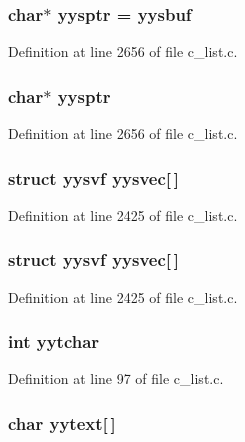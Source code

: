 \subsubsection{\setlength{\rightskip}{0pt plus 5cm}char$\ast$ \bf{yysptr} = \bf{yysbuf}}\label{c__list_8c_c2e277904ae84b934c585198523d740b}




Definition at line 2656 of file c\_\-list.c.
\subsubsection{\setlength{\rightskip}{0pt plus 5cm}char$\ast$ \bf{yysptr}}\label{c__list_8c_c2e277904ae84b934c585198523d740b}




Definition at line 2656 of file c\_\-list.c.
\subsubsection{\setlength{\rightskip}{0pt plus 5cm}struct \bf{yysvf} \bf{yysvec}[$\,$]}\label{c__list_8c_2011359449066c5432dae89171db9d17}




Definition at line 2425 of file c\_\-list.c.
\subsubsection{\setlength{\rightskip}{0pt plus 5cm}struct \bf{yysvf} \bf{yysvec}[$\,$]}\label{c__list_8c_2011359449066c5432dae89171db9d17}




Definition at line 2425 of file c\_\-list.c.
\subsubsection{\setlength{\rightskip}{0pt plus 5cm}int \bf{yytchar}}\label{c__list_8c_620e886e7e57cf0fcb0d54c2b9255521}




Definition at line 97 of file c\_\-list.c.
\subsubsection{\setlength{\rightskip}{0pt plus 5cm}char \bf{yytext}[$\,$]}\label{c__list_8c_9a562617a3c8e3355e76a721bf01cf9d}


